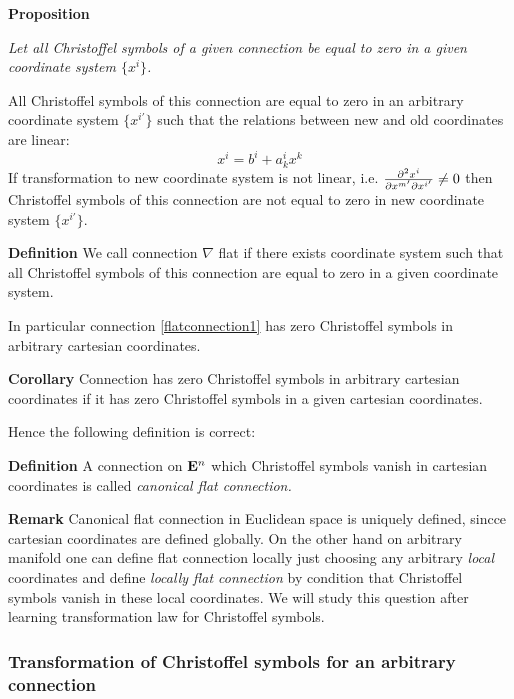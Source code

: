 \documentclass[12pt]{article}
\theoremstyle{theorem}
\numberwithin{equation}{section}
\begin{document}
\m

 {\bf Proposition} {\it
   Let all Christoffel symbols of a given connection be equal to zero
 in a given coordinate system $\{x^i\}$.

  All Christoffel symbols of this connection are equal to zero in an arbitrary
 coordinate system  $\{x^{i'}\}$ such that the relations between new and old coordinates are linear:
               \begin{equation}\label{additionalterm1}
                   x^i=b^i+a^i_kx^k
                    \end{equation}
 If transformation to new coordinate system is not linear, i.e.  ${\partial^2 x^{i}\over \partial x^{m'}\partial x^{i'}}\not=0$
 then Christoffel symbols of this connection are not equal to zero in new
 coordinate system  $\{x^{i'}\}$.}

\m

{\bf Definition} We call connection $\nabla$ flat if there exists coordinate system such that
all Christoffel symbols of this connection are equal to zero in a given coordinate system.

\m

In particular connection \eqref{flatconnection1} has zero Christoffel symbols in arbitrary cartesian coordinates.



{\bf Corollary} Connection has zero Christoffel symbols in arbitrary cartesian coordinates
if it has zero Christoffel symbols in a given cartesian coordinates.


Hence the following definition is correct:

\m


{\bf Definition}  A connection on ${\bf E}^n$ which Christoffel symbols vanish in cartesian coordinates
is called {\it canonical flat connection.}


{\bf Remark} {\small   Canonical flat connection in Euclidean space is uniquely defined, sincce cartesian coordinates
are defined globally.  On the other hand
on arbitrary manifold one can define flat connection locally just choosing any arbitrary {\it local}
coordinates and define {\it locally flat connection} by condition that Christoffel symbols
vanish in these local coordinates.  We will study this question after learning transformation law for Christoffel symbols.}




\subsubsection {Transformation of Christoffel symbols for an arbitrary connection}
\end{document}
